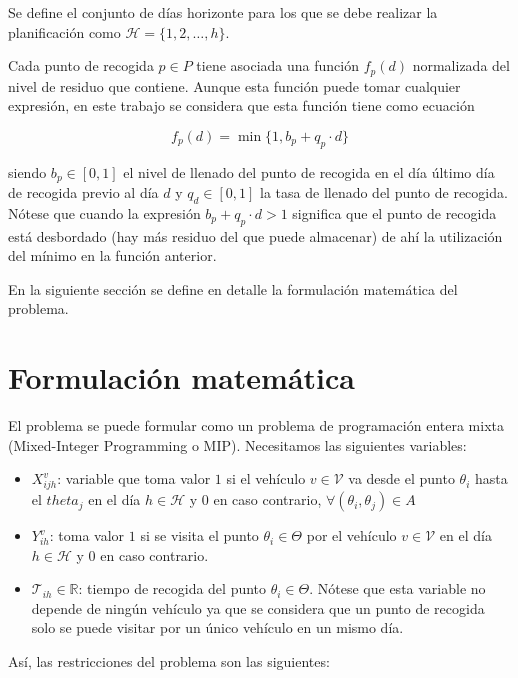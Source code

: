 \documentclass[
]{article}
\providecommand{\tightlist}{%
  \setlength{\itemsep}{0pt}\setlength{\parskip}{0pt}}
\begin{document}
Se define el conjunto de días horizonte para los que se debe realizar la
planificación como \(\mathcal{H}=\{1,2,\ldots, h\}\).

Cada punto de recogida \(p \in P\) tiene asociada una función \(f_p(d)\)
normalizada del nivel de residuo que contiene. Aunque esta función puede
tomar cualquier expresión, en este trabajo se considera que esta función
tiene como ecuación

\[
f_p(d)=\min\{1, b_p + q_p \cdot d \}
\]

siendo \(b_p\in [0,1]\) el nivel de llenado del punto de recogida en el
día último día de recogida previo al día \(d\) y \(q_d\in [0,1]\) la
tasa de llenado del punto de recogida. Nótese que cuando la expresión
\(b_p + q_p \cdot d > 1\) significa que el punto de recogida está
desbordado (hay más residuo del que puede almacenar) de ahí la
utilización del mínimo en la función anterior.

En la siguiente sección se define en detalle la formulación matemática
del problema.

\hypertarget{formulaciuxf3n-matemuxe1tica}{%
\section{Formulación matemática}\label{formulaciuxf3n-matemuxe1tica}}

El problema se puede formular como un problema de programación entera
mixta (Mixed-Integer Programming o MIP). Necesitamos las siguientes
variables:

\begin{itemize}
\tightlist
\item
  \(X_{ijh}^v\): variable que toma valor \(1\) si el vehículo
  \(v\in\mathcal{V}\) va desde el punto \(\theta_i\) hasta el
  \(theta_j\) en el día \(h\in \mathcal{H}\) y 0 en caso contrario,
  \(\forall (\theta_i,\theta_j) \in A\)
\item
  \(Y_{ih}^v\): toma valor \(1\) si se visita el punto
  \(\theta_i\in\Theta\) por el vehículo \(v\in\mathcal{V}\) en el día
  \(h\in\mathcal{H}\) y 0 en caso contrario.
\item
  \(\mathcal{T}_{ih}\in\mathbb{R}\): tiempo de recogida del punto
  \(\theta_i\in\Theta\). Nótese que esta variable no depende de ningún
  vehículo ya que se considera que un punto de recogida solo se puede
  visitar por un único vehículo en un mismo día.
\end{itemize}

Así, las restricciones del problema son las siguientes:
\end{document}
